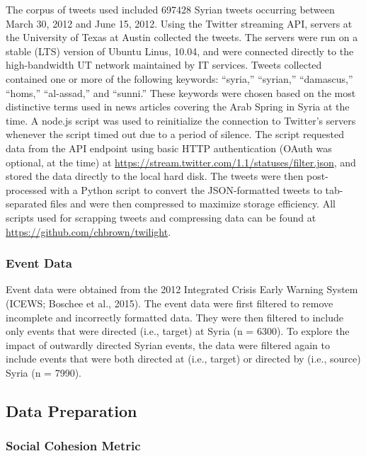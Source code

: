 \documentclass[english,man]{apa6}
\begin{document}
The corpus of tweets used included 697428 Syrian tweets occurring between March 30, 2012 and June 15, 2012. Using the Twitter streaming API, servers at the University of Texas at Austin collected the tweets. The servers were run on a stable (LTS) version of Ubuntu Linus, 10.04, and were connected directly to the high-bandwidth UT network maintained by IT services.
Tweets collected contained one or more of the following keywords: \enquote{syria,} \enquote{syrian,} \enquote{damascus,} \enquote{homs,} \enquote{al-assad,} and \enquote{sunni.} These keywords were chosen based on the most distinctive terms used in news articles covering the Arab Spring in Syria at the time. A node.js script was used to reinitialize the connection to Twitter's servers whenever the script timed out due to a period of silence. The script requested data from the API endpoint using basic HTTP authentication (OAuth was optional, at the time) at \url{https://stream.twitter.com/1.1/statuses/filter.json}, and stored the data directly to the local hard disk. The tweets were then post-processed with a Python script to convert the JSON-formatted tweets to tab-separated files and were then compressed to maximize storage efficiency.
All scripts used for scrapping tweets and compressing data can be found at \url{https://github.com/chbrown/twilight}.

\hypertarget{event-data}{%
\subsubsection{Event Data}\label{event-data}}

Event data were obtained from the 2012 Integrated Crisis Early Warning System (ICEWS; Boschee et al., 2015). The event data were first filtered to remove incomplete and incorrectly formatted data. They were then filtered to include only events that were directed (i.e., target) at Syria (n = 6300). To explore the impact of outwardly directed Syrian events, the data were filtered again to include events that were both directed at (i.e., target) or directed by (i.e., source) Syria (n = 7990).

\hypertarget{data-preparation}{%
\subsection{Data Preparation}\label{data-preparation}}

\hypertarget{social-cohesion-metric}{%
\subsubsection{Social Cohesion Metric}\label{social-cohesion-metric}}
\end{document}
